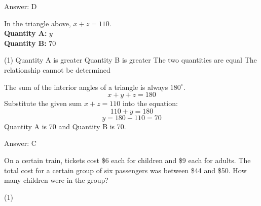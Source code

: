 \documentclass[11pt,paper=a4,answers]{exam}
\begin{document}
\begin{questions}
\begin{solution}
Answer: \colorbox{yellow!100}{D}
\end{solution}

\vspace{1cm}

\question
\begin{center}
\end{center}
In the triangle above, $x + z = 110$.
\\[0.3cm]
\textbf{Quantity A: } $y$ \\
\textbf{Quantity B: } $70$

\begin{tasks}(1)
\task[A)] Quantity A is greater
\task[B)] Quantity B is greater
\task[C)] The two quantities are equal
\task[D)] The relationship cannot be determined
\end{tasks}

\begin{solution}
The sum of the interior angles of a triangle is always $180^\circ$.
\vspace{5pt}
\[ x + y + z = 180 \]
\vspace{5pt}
Substitute the given sum $x + z = 110$ into the equation:
\vspace{5pt}
\[ 110 + y = 180 \]
\vspace{5pt}
\[ y = 180 - 110 = 70 \]
\vspace{5pt}
Quantity A is 70 and Quantity B is 70.

Answer: \colorbox{yellow!100}{C}
\end{solution}

\vspace{1cm}


\question
On a certain train, tickets cost \$6 each for children and \$9 each for adults. The total cost for a certain group of six passengers was between \$44 and \$50. How many children were in the group?

\begin{tasks}(1)
\end{tasks}


\end{questions}
\end{document}
